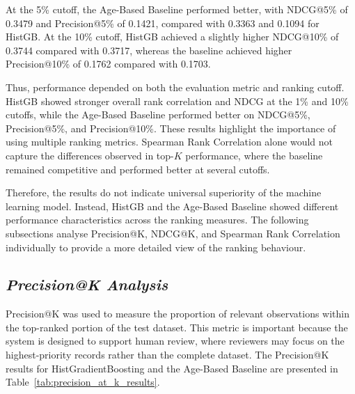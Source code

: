 \documentclass[12pt,a4paper]{report}
\begin{document}
At the 5\% cutoff, the Age-Based Baseline performed better, with NDCG@5\% of 0.3479 and Precision@5\% of 0.1421, compared with 0.3363 and 0.1094 for HistGB. At the 10\% cutoff, HistGB achieved a slightly higher NDCG@10\% of 0.3744 compared with 0.3717, whereas the baseline achieved higher Precision@10\% of 0.1762 compared with 0.1703.

Thus, performance depended on both the evaluation metric and ranking cutoff. HistGB showed stronger overall rank correlation and NDCG at the 1\% and 10\% cutoffs, while the Age-Based Baseline performed better on NDCG@5\%, Precision@5\%, and Precision@10\%. These results highlight the importance of using multiple ranking metrics. Spearman Rank Correlation alone would not capture the differences observed in top-$K$ performance, where the baseline remained competitive and performed better at several cutoffs.

Therefore, the results do not indicate universal superiority of the machine learning model. Instead, HistGB and the Age-Based Baseline showed different performance characteristics across the ranking measures. The following subsections analyse Precision@K, NDCG@K, and Spearman Rank Correlation individually to provide a more detailed view of the ranking behaviour.

\subsection{\textit{Precision@K Analysis}}
Precision@K was used to measure the proportion of relevant observations within the top-ranked portion of the test dataset. This metric is important because the system is designed to support human review, where reviewers may focus on the highest-priority records rather than the complete dataset. The Precision@K results for HistGradientBoosting and the Age-Based Baseline are presented in Table~\ref{tab:precision_at_k_results}.
\end{document}
